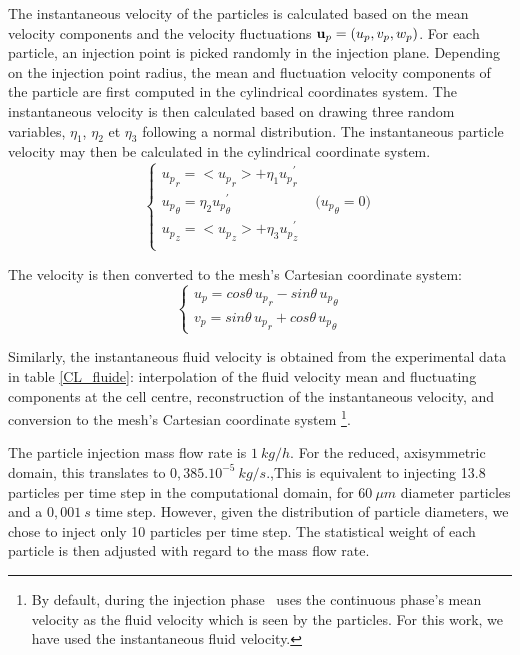 \documentclass[a4paper,twoside,12pt]{article}
\begin{document}
\begin{itemize}
The instantaneous velocity of the particles is calculated based on the mean velocity components and the velocity fluctuations $\mathbf u_p=(u_p,v_p,w_p)$. For each particle, an injection point is picked randomly in the injection plane. Depending on the injection point radius, the mean and fluctuation velocity components of the particle are first computed in the cylindrical coordinates system. The instantaneous velocity is then calculated based on drawing three random variables, $\eta_1$, $\eta_2$ et $\eta_3$ following a normal distribution. The instantaneous particle velocity may then be calculated in the cylindrical coordinate system.
\begin{equation}
   \left\{\begin{array}{l}
      {u_p}_r=<{u_p}_r>+\eta_1 {u_p}_r^\prime \\
      {u_p}_\theta=\eta_2{u_p}_{\theta}^\prime\qquad\qquad\qquad
      \text{(${u_p}_\theta=0$)}               \\
      {u_p}_z=<{u_p}_z>+\eta_3{u_p}_z^\prime  \\
   \end{array}\right.
\end{equation}

The velocity is then converted to the mesh's Cartesian coordinate system:
\begin{equation}
   \left\{\begin{array}{l}
      u_p=cos\theta\, {u_p}_r- sin\theta\, {u_p}_\theta \\
      v_p=sin\theta\, {u_p}_r+ cos\theta\, {u_p}_\theta
   \end{array}\right.
\end{equation}

Similarly, the instantaneous fluid velocity is obtained from the experimental data in table \ref{CL_fluide}: interpolation of the fluid velocity mean and fluctuating components at the cell centre, reconstruction of the instantaneous velocity, and conversion to the mesh's Cartesian coordinate system \footnote{By default, during the injection phase \CS\ uses the continuous phase's mean velocity as the fluid velocity which is seen by the particles. For this work, we have used the instantaneous fluid velocity.}.

\noindent
The particle injection mass flow rate is $1~kg/h$. For the reduced, axisymmetric domain, this translates to $0,385.10^{-5}~kg/s$.,This is equivalent to injecting 13.8 particles per time step in the computational domain, for $60~\mu m$ diameter particles and a $0,001~s$ time step. However, given the distribution of particle diameters, we chose to inject only 10 particles per time step. The statistical weight of each particle is then adjusted with regard to the mass flow rate.\\


\end{itemize}
\end{document}
